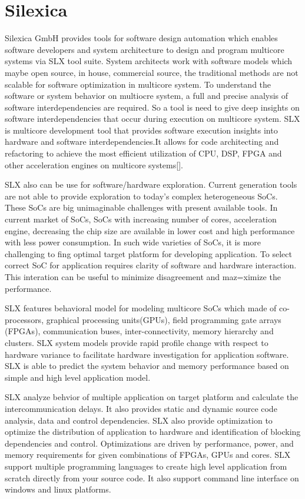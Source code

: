 \section{Silexica}
Silexica GmbH provides tools for software design automation which enables software developers and system architecture to design and program multicore systems via SLX tool suite. System architects work with software models which maybe open source, in house, commercial source, the traditional methods are not scalable for software optimization in multicore system. To understand the software or system behavior on multiocre system, a full and precise analysis of software interdependencies are required. So a tool is need to give deep insights on software interdependencies that occur during execution on multicore system. SLX is multicore development tool that provides software execution insights into hardware and software interdependencies.It allows for code architecting and refactoring to achieve the most efficient utilization of CPU, DSP, FPGA and other acceleration engines on multicore systems[].

\par SLX also can be use for software/hardware exploration. Current generation tools are not able to provide exploration to today's complex heterogeneous SoCs. These SoCs are big unimaginable challenges with present available tools. In current market of SoCs, SoCs with increasing number of cores, acceleration engine, decreasing the chip size are available in lower cost and high performance with less power consumption. In such wide varieties of SoCs, it is more challenging to fing optimal target platform for developing application. To select correct SoC for application requires clarity of software and hardware interaction. This interation can be useful to minimize disagreement and maz=ximize the performance. 

\par SLX features behavioral model for modeling multicore SoCs which made of co-processors, graphical processing units(GPUs), field programming gate arrays (FPGAs), communication buses, inter-connectivity, memory hierarchy and clusters. SLX system models provide rapid profile change with respect to hardware variance to facilitate hardware investigation for application software. SLX is able to predict the system behavior and memory performance based on simple and high level application model.

\par SLX analyze behvior of multiple application on target platform  and calculate the intercommunication delays. It also provides static and dynamic source code analysis, data and control dependencies. SLX also provide optimization to optimize the distribution of application to hardware and identification of blocking dependencies and control. Optimizations are driven by performance, power, and memory requirements for given combinations of FPGAs, GPUs and cores.  SLX support multiple programming languages to create high level application from scratch directly from your source code. It also support command line interface on windows and linux platforms. 

